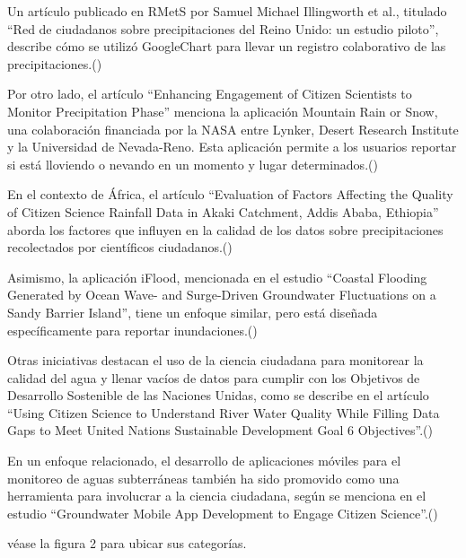 Un artículo publicado en RMetS por Samuel Michael Illingworth et al., titulado “Red de ciudadanos sobre precipitaciones del Reino Unido: un estudio piloto”, describe cómo se utilizó GoogleChart para llevar un registro colaborativo de las precipitaciones.(\cite{illingworth2021ukprecipitation}) 

Por otro lado, el artículo “Enhancing Engagement of Citizen Scientists to Monitor Precipitation Phase” menciona la aplicación Mountain Rain or Snow, una colaboración financiada por la NASA entre Lynker, Desert Research Institute y la Universidad de Nevada-Reno. Esta aplicación permite a los usuarios reportar si está lloviendo o nevando en un momento y lugar determinados.(\cite{lute2021enhancing})


En el contexto de África, el artículo “Evaluation of Factors Affecting the Quality of Citizen Science Rainfall Data in Akaki Catchment, Addis Ababa, Ethiopia” aborda los factores que influyen en la calidad de los datos sobre precipitaciones recolectados por científicos ciudadanos.(\cite{tedla2022evaluation}) 

Asimismo, la aplicación iFlood, mencionada en el estudio “Coastal Flooding Generated by Ocean Wave- and Surge-Driven Groundwater Fluctuations on a Sandy Barrier Island”, tiene un enfoque similar, pero está diseñada específicamente para reportar inundaciones.(\cite{elgar2021coastal}) 


Otras iniciativas destacan el uso de la ciencia ciudadana para monitorear la calidad del agua y llenar vacíos de datos para cumplir con los Objetivos de Desarrollo Sostenible de las Naciones Unidas, como se describe en el artículo “Using Citizen Science to Understand River Water Quality While Filling Data Gaps to Meet United Nations Sustainable Development Goal 6 Objectives”.(\cite{mcginn2021using})

En un enfoque relacionado, el desarrollo de aplicaciones móviles para el monitoreo de aguas subterráneas también ha sido promovido como una herramienta para involucrar a la ciencia ciudadana, según se menciona en el estudio “Groundwater Mobile App Development to Engage Citizen Science”.(\cite{dennis2019groundwater})



véase la figura 2 para ubicar sus categorías.















